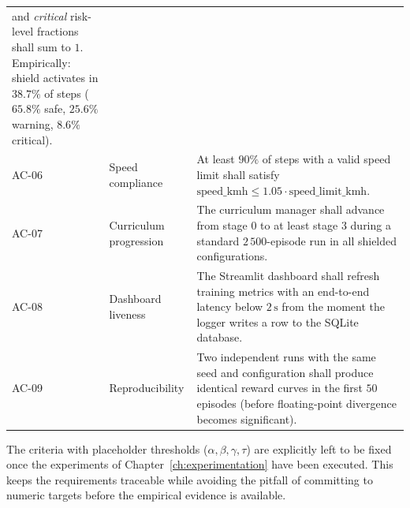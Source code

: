 \begin{table}[H]
\begin{tabular}{@{}llp{7.5cm}@{}}
        and \emph{critical} risk-level fractions shall sum to \(1\). Empirically: shield
        activates in \(38.7\%\) of steps (\(65.8\%\) safe, \(25.6\%\) warning, \(8.6\%\)
        critical). \\
    AC-06 & Speed compliance       & At least \(90\%\) of steps with a valid speed limit shall
        satisfy \(\text{speed\_kmh} \le 1.05\cdot\text{speed\_limit\_kmh}\). \\
    AC-07 & Curriculum progression & The curriculum manager shall advance from stage 0 to at
        least stage 3 during a standard \(2\,500\)-episode run in all shielded
        configurations. \\
    AC-08 & Dashboard liveness     & The Streamlit dashboard shall refresh training metrics
        with an end-to-end latency below \(2\,\mathrm{s}\) from the moment the logger writes a
        row to the SQLite database. \\
    AC-09 & Reproducibility        & Two independent runs with the same seed and configuration
        shall produce identical reward curves in the first \(50\) episodes (before floating-point
        divergence becomes significant). \\
    \bottomrule
  \end{tabular}
\end{table}

The criteria with placeholder thresholds (\(\alpha, \beta, \gamma, \tau\)) are explicitly left to
be fixed once the experiments of Chapter~\ref{ch:experimentation} have been executed. This keeps
the requirements traceable while avoiding the pitfall of committing to numeric targets before the
empirical evidence is available.

\clearpage
